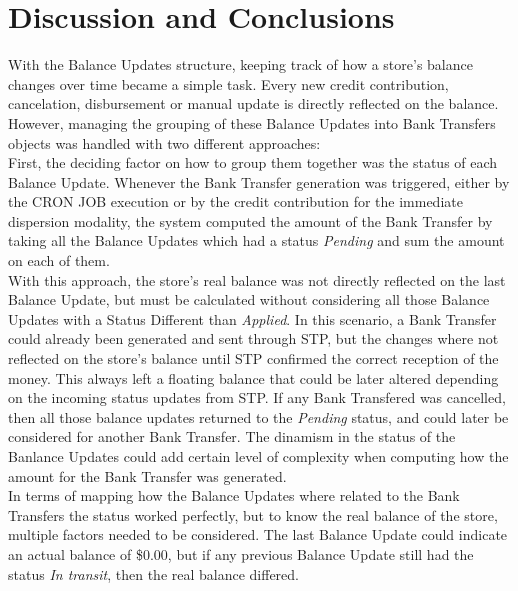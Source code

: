 
\chapter{Discussion and Conclusions}

With the Balance Updates structure, keeping track of how a store's balance changes over time became a simple task. Every new credit contribution, cancelation, disbursement or manual update is directly reflected on the balance. However, managing the grouping of these Balance Updates into Bank Transfers objects was handled with two different approaches:\\

First, the deciding factor on how to group them together was the status of each Balance Update. Whenever the Bank Transfer generation was triggered, either by the CRON JOB execution or by the credit contribution for the immediate dispersion modality, the system computed the amount of the Bank Transfer by taking all the Balance Updates which had a status \textit{Pending} and sum the amount on each of them.\\ 

With this approach, the store's real balance was not directly reflected on the last Balance Update, but must be calculated without considering all those Balance Updates with a Status Different than \textit{Applied}. In this scenario, a Bank Transfer could already been generated and sent through STP, but the changes where not reflected on the store's balance until STP confirmed the correct reception of the money. This always left a floating balance that could be later altered depending on the incoming status updates from STP. If any Bank Transfered was cancelled, then all those balance updates returned to the \textit{Pending} status, and could later be considered for another Bank Transfer. The dinamism in the status of the Banlance Updates could add certain level of complexity when computing how the amount for the Bank Transfer was generated.\\ 

In terms of mapping how the Balance Updates where related to the Bank Transfers the status worked perfectly, but to know the real balance of the store, multiple factors needed to be considered. The last Balance Update could indicate an actual balance of \$0.00, but if any previous Balance Update still had the status \textit{In transit}, then the real balance differed.\\ 

